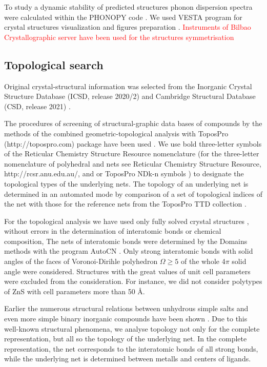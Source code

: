 \documentclass[a4paperm]{article}
\begin{document}
To study a dynamic stability of predicted structures phonon dispersion spectra were calculated within the PHONOPY code \cite{phonopy}. 
We used VESTA program for crystal structures visualization and figures preparation \cite{momma2011vesta}.
\textcolor{red}{Instruments of Bilbao Crystallographic server have been used for the structures symmetrisation \cite{}}


\subsection*{Topological search}

Original crystal-structural information was selected from the Inorganic Crystal Structure Database (ICSD, release 2020/2) \cite{icsd_1} and Cambridge Structural Database (CSD, release 2021) \cite{icsd_2}.

The procedures of screening of structural-graphic data bases of compounds by the methods of the combined geometric-topological analysis with ToposPro (http://topospro.com) package have been used \cite{topos_1}. 
We use bold three-letter symbols of the Reticular Chemistry Structure Resource nomenclature (for the three-letter nomenclature of polyhedral and nets see Reticular Chemistry Structure Resource, http://rcsr.anu.edu.au/, and \cite{rcsr} or ToposPro NDk-n symbols \cite{rcsr_2}) to designate the topological types of the underlying nets. 
The topology of an underlying net is determined in an automated mode by comparison of a set of topological indices of the net with those for the reference nets from the ToposPro TTD collection \cite{TTD}.

For the topological analysis we have used only fully solved crystal structures , without errors in the determination of interatomic bonds or chemical composition,
The nets of interatomic bonds were determined by the Domains methods with the program AutoCN \cite{blatov2016_rods}. 
Only strong interatomic bonds  with solid angles of the faces of Voronoi-Dirihle polyhedron $\Omega \geq 5 $ of the whole 4$\pi$ solid angle were considered.
Structures with the great values of unit cell parameters were excluded from the consideration.
For instance, we did not consider polytypes of ZnS with cell parameters more than 50 \AA.

Earlier the numerous structural relations between unhydrous simple salts and even more simple binary inorganic compounds have been shown \cite{blatov2011_salts, medrish2020_zintl}. 
Due to this well-known structural phenomena, we analyse topology not only for the complete  representation, but all so the topology of the underlying net.
In the complete representation, the net corresponds to the interatomic bonds of all strong bonds, while the underlying net is determined between metalls and centers of ligands.
\end{document}

